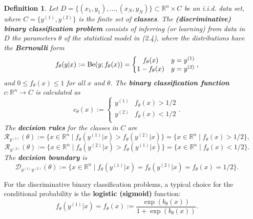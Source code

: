\documentclass{report}
\newtheorem{definition}{Definition}[chapter]
\begin{document}
\begin{definition}
Let $D = \{(x_1,y_1),\dots,(x_N,y_N)\} \subset \mathbb{R}^n \times C$ be an i.i.d. data set, where $C = \{y^{(1)}, y^{(2)}\}$ is the finite set of \textbf{classes}. The \textbf{(discriminative) binary classification problem} consists of inferring (or learning) from data in $D$ the parameters $\theta$ of the statistical model in (2.4), where the distributions have the \textbf{Bernoulli} form
\begin{equation}
f_\theta(y|x) := \textup{Be}(y;f_\theta(x)) = \left\{\begin{matrix}
f_\theta(x) & y=y^{(1)}\\
1 - f_\theta(x) & y = y^{(2)} \\
\end{matrix}\right.,
\end{equation}
and $0 \leq f_\theta(x) \leq 1$ for all $x$ and $\theta$. The \textbf{binary classification function} $c : \mathbb{R}^n \to C$ is calculated as
\begin{equation}
c_\theta(x) := \left\{\begin{matrix}
y^{(1)} & f_\theta(x) > 1/2\\
y^{(2)} & f_\theta(x) < 1/2\\
\end{matrix}\right..
\end{equation}
The \textbf{decision rules} for the classes in $C$ are
\begin{equation}
\mathcal{R}_{y^{(1)}}(\theta) := \{x \in \mathbb{R}^n \mid f_\theta(y^{(1)}|x) > f_\theta(y^{(2)}|x)\} = \{x \in \mathbb{R}^n \mid f_\theta(x) > 1/2\},
\end{equation}
\begin{equation}
\mathcal{R}_{y^{(2)}}(\theta) := \{x \in \mathbb{R}^n \mid f_\theta(y^{(2)}|x) > f_\theta(y^{(1)}|x)\} = \{x \in \mathbb{R}^n \mid f_\theta(x) < 1/2\}.
\end{equation}
The \textbf{decision boundary} is
\begin{equation}
\mathcal{D}_{y^{(1)}y^{(2)}}(\theta) := \{x \in \mathbb{R}^n \mid f_\theta(y^{(1)}|x) = f_\theta(y^{(2)}|x) = f_\theta(x) = 1/2\}.
\end{equation}
\end{definition}

For the discriminative binary classification problems, a typical choice for the conditional probability is the \textbf{logistic (sigmoid)} function:
\begin{equation}
f_\theta(y^{(1)}|x) = f_\theta(x) := \frac{\exp (b_\theta(x))}{1+\exp (b_\theta(x))}.
\end{equation}
\end{document}
